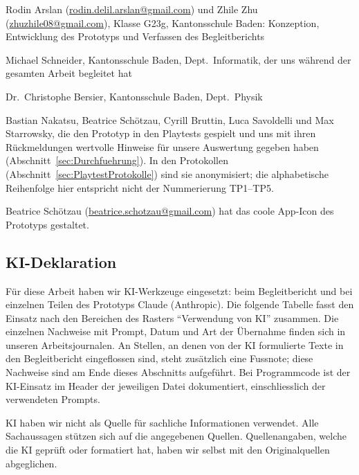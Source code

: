 \documentclass[../Main.tex]{subfiles}
\begin{document}
\begin{description}[leftmargin=1.5cm, style=nextline, itemsep=0.6em]
    \item[Projektteam] Rodin Arslan (\url{rodin.delil.arslan@gmail.com}) und Zhile Zhu (\url{zhuzhile08@gmail.com}), Klasse G23g, Kantonsschule Baden: Konzeption, Entwicklung des Prototyps und Verfassen des Begleitberichts
    \item[Erstbetreuung] Michael Schneider, Kantonsschule Baden, Dept.\ Informatik, der uns während der gesamten Arbeit begleitet hat
    \item[Zweitbetreuung] Dr.\ Christophe Bersier, Kantonsschule Baden, Dept.\ Physik
    \item[Testpersonen] Bastian Nakatsu, Beatrice Schötzau, Cyrill Bruttin, Luca Savoldelli und Max Starrowsky, die den Prototyp in den Playtests gespielt und uns mit ihren Rückmeldungen wertvolle Hinweise für unsere Auswertung gegeben haben (Abschnitt~\ref{sec:Durchfuehrung}). In den Protokollen (Abschnitt~\ref{sec:PlaytestProtokolle}) sind sie anonymisiert; die alphabetische Reihenfolge hier entspricht nicht der Nummerierung TP1--TP5.
    \item[Weitere Unterstützung] Beatrice Schötzau (\url{beatrice.schotzau@gmail.com}) hat das coole App-Icon des Prototyps gestaltet.
\end{description}

\subsection{KI-Deklaration} \label{sec:KIDeklaration}

Für diese Arbeit haben wir KI-Werkzeuge eingesetzt: beim Begleitbericht und bei einzelnen Teilen des Prototyps Claude (Anthropic). Die folgende Tabelle fasst den Einsatz nach den Bereichen des Rasters \enquote{Verwendung von KI} zusammen. Die einzelnen Nachweise mit Prompt, Datum und Art der Übernahme finden sich in unseren Arbeitsjournalen. An Stellen, an denen von der KI formulierte Texte in den Begleitbericht eingeflossen sind, steht zusätzlich eine Fussnote; diese Nachweise sind am Ende dieses Abschnitts aufgeführt. Bei Programmcode ist der KI-Einsatz im Header der jeweiligen Datei dokumentiert, einschliesslich der verwendeten Prompts.

KI haben wir nicht als Quelle für sachliche Informationen verwendet. Alle Sachaussagen stützen sich auf die angegebenen Quellen. Quellenangaben, welche die KI geprüft oder formatiert hat, haben wir selbst mit den Originalquellen abgeglichen.
\end{document}
